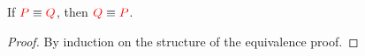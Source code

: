 \begin{theorem}[Symmetry]\label{thm:cp-symmetry}
  If $\textcolor{red}{P} \equiv \textcolor{red}{Q}$, then $\textcolor{red}{Q} \equiv \textcolor{red}{P}$.
\end{theorem}
\begin{proof}
  By induction on the structure of the equivalence proof.
\end{proof}
